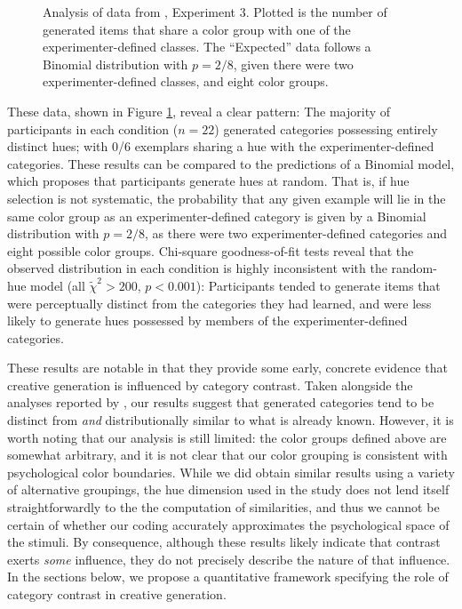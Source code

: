 \documentclass[12pt]{article}
\newcommand\inputpgf[2]{{
\let\pgfimageWithoutPath\pgfimage
\renewcommand{\pgfimage}[2][]{\pgfimageWithoutPath[##1]{#1/##2}}

}}
\begin{document}
\begin{flushleft}
\begin{figure}
    \begin{center}
        \inputpgf{figs/}{jk13-huecontrast.pgf}
        \caption{Analysis of data from \cite{jern2013probabilistic}, Experiment 3. Plotted is the number of generated items that share a color group with one of the experimenter-defined classes. The ``Expected'' data follows a Binomial distribution with $p=2/8$, given there were two experimenter-defined classes, and eight color groups.}
        \label{fig:jk13-huecontrast}
    \end{center}
\end{figure}

These data, shown in Figure \ref{fig:jk13-huecontrast}, reveal a clear pattern: The majority of participants in each condition ($n = 22$) generated categories possessing entirely distinct hues; with 0/6 exemplars sharing a hue with the experimenter-defined categories. These results can be compared to the predictions of a Binomial model, which proposes that participants generate hues at random. That is, if hue selection is not systematic, the probability that any given example will lie in the same color group as an experimenter-defined category is given by a Binomial distribution with $p = 2/8$, as there were two experimenter-defined categories and eight possible color groups. Chi-square goodness-of-fit tests reveal that the observed distribution in each condition is highly inconsistent with the random-hue model (all $\tilde{\chi}^2>200$, $p<0.001$): Participants tended to generate items that were perceptually distinct from the categories they had learned, and were less likely to generate hues possessed by members of the experimenter-defined categories.

These results are notable in that they provide some early, concrete evidence that creative generation is influenced by category contrast. Taken alongside the analyses reported by \cite{jern2013probabilistic}, our results suggest that generated categories tend to be distinct from \textit{and} distributionally similar to what is already known. However, it is worth noting that our analysis is still limited: the color groups defined above are somewhat arbitrary, and it is not clear that our color grouping is consistent with psychological color boundaries. While we did obtain similar results using a variety of alternative groupings, the hue dimension used in the \cite{jern2013probabilistic} study does not lend itself straightforwardly to the the computation of similarities, and thus we cannot be certain of whether our coding accurately approximates the psychological space of the stimuli. By consequence, although these results likely indicate that contrast exerts \textit{some} influence, they do not precisely describe the nature of that influence. In the sections below, we propose a quantitative framework specifying the role of category contrast in creative generation.


\end{flushleft}
\end{document}

